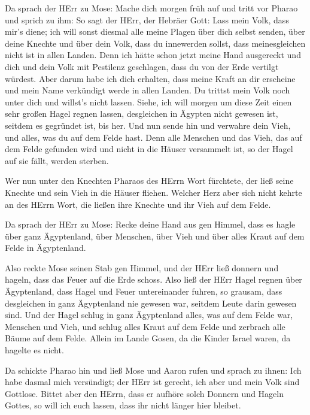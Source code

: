  Da sprach der HErr zu Mose: Mache dich morgen früh auf und
tritt vor Pharao und sprich zu ihm: So sagt der HErr, der Hebräer Gott:
Lass mein Volk, dass mir's diene;  ich will sonst diesmal
alle meine Plagen über dich selbst senden, über deine Knechte und über
dein Volk, dass du innewerden sollst, dass meinesgleichen nicht ist in
allen Landen.  Denn ich hätte schon jetzt meine Hand
ausgereckt und dich und dein Volk mit Pestilenz geschlagen, dass du von
der Erde vertilgt würdest.  Aber darum habe ich dich
erhalten, dass meine Kraft an dir erscheine und mein Name verkündigt
werde in allen Landen.  Du trittst mein Volk noch unter
dich und willst's nicht lassen.  Siehe, ich will morgen um
diese Zeit einen sehr großen Hagel regnen lassen, desgleichen in Ägypten
nicht gewesen ist, seitdem es gegründet ist, bis her.  Und
nun sende hin und verwahre dein Vieh, und alles, was du auf dem Felde
hast. Denn alle Menschen und das Vieh, das auf dem Felde gefunden wird
und nicht in die Häuser versammelt ist, so der Hagel auf sie fällt,
werden sterben.

 Wer nun unter den Knechten Pharaos des HErrn Wort
fürchtete, der ließ seine Knechte und sein Vieh in die Häuser fliehen.
 Welcher Herz aber sich nicht kehrte an des HErrn Wort, die
ließen ihre Knechte und ihr Vieh auf dem Felde.

 Da sprach der HErr zu Mose: Recke deine Hand aus gen
Himmel, dass es hagle über ganz Ägyptenland, über Menschen, über Vieh
und über alles Kraut auf dem Felde in Ägyptenland.

 Also reckte Mose seinen Stab gen Himmel, und der HErr ließ
donnern und hageln, dass das Feuer auf die Erde schoss. Also ließ der
HErr Hagel regnen über Ägyptenland,  dass Hagel und Feuer
untereinander fuhren, so grausam, dass desgleichen in ganz Ägyptenland
nie gewesen war, seitdem Leute darin gewesen sind.  Und der
Hagel schlug in ganz Ägyptenland alles, was auf dem Felde war, Menschen
und Vieh, und schlug alles Kraut auf dem Felde und zerbrach alle Bäume
auf dem Felde.  Allein im Lande Gosen, da die Kinder Israel
waren, da hagelte es nicht.

 Da schickte Pharao hin und ließ Mose und Aaron rufen und
sprach zu ihnen: Ich habe dasmal mich versündigt; der HErr ist gerecht,
ich aber und mein Volk sind Gottlose.  Bittet aber den
HErrn, dass er aufhöre solch Donnern und Hageln Gottes, so will ich euch
lassen, dass ihr nicht länger hier bleibet.

